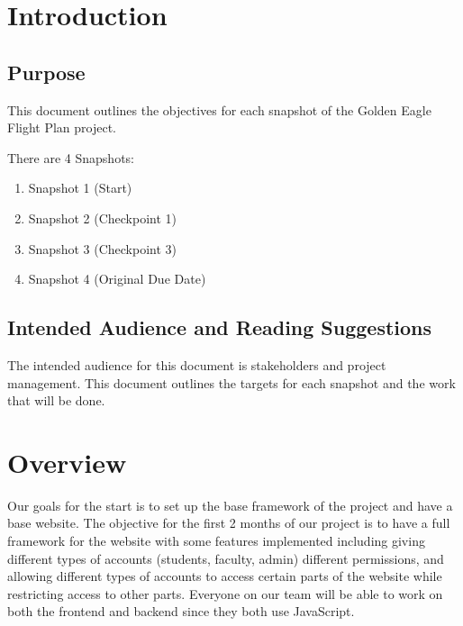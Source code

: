 \newcommand{\documentName}{Snapshot Objectives}
\newcommand{\shortDocumentName}{SO}





\firstPageBlock

\newpage %
\section{Introduction}
\subsection{Purpose}
This document outlines the objectives for each snapshot of the Golden Eagle Flight Plan project.

There are 4 Snapshots:
	\begin{enumerate}[leftmargin=3\parindent]
		\item Snapshot 1 (Start)
		\item Snapshot 2 (Checkpoint 1)
		\item Snapshot 3 (Checkpoint 3)
		\item Snapshot 4 (Original Due Date)
	\end{enumerate}


\subsection{Intended Audience and Reading Suggestions}
The intended audience for this document is stakeholders and project management.
This document outlines the targets for each snapshot and the work that will be done.

\newpage %
\section{Overview}
Our goals for the start is to set up the base framework of the project and have a base website. The objective for the first 2 months of our project is to have a full framework for the website with some features implemented including giving different types of accounts (students, faculty, admin) different permissions, and allowing different types of accounts to access certain parts of the website while restricting access to other parts. Everyone on our team will be able to work on both the frontend and backend since they both use JavaScript.

